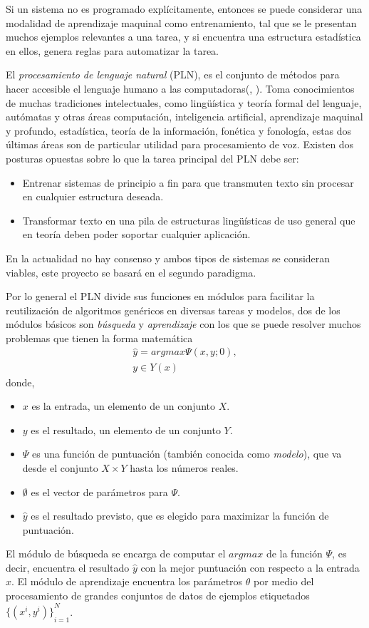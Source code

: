 Si un sistema no es programado explícitamente, entonces se puede considerar una modalidad de aprendizaje maquinal como entrenamiento, tal que se le presentan muchos ejemplos relevantes a una tarea, y si encuentra una estructura estadística en ellos, genera reglas para automatizar la tarea.

El \emph{procesamiento de lenguaje natural} (PLN), es el conjunto de métodos para hacer accesible el lenguaje humano a las computadoras(\citeauthor{eise19}, \citeyear{eise19}). Toma conocimientos de muchas tradiciones intelectuales, como lingüística y teoría formal del lenguaje, autómatas y otras áreas computación, inteligencia artificial, aprendizaje maquinal y profundo, estadística, teoría de la información, fonética y fonología, estas dos últimas áreas son de particular utilidad para procesamiento de voz. Existen dos posturas opuestas sobre lo que la tarea principal del PLN debe ser:
\begin{itemize}
	\item Entrenar sistemas de principio a fin para que transmuten texto sin procesar en cualquier estructura deseada.
	\item Transformar texto en una pila de estructuras lingüísticas de uso general que en teoría deben poder soportar cualquier aplicación.
\end{itemize}
En la actualidad no hay consenso y ambos tipos de sistemas se consideran viables, este proyecto se basará en el segundo paradigma. 

Por lo general el PLN divide sus funciones en módulos para facilitar la reutilización de algoritmos genéricos en diversas tareas y modelos, dos de los módulos básicos son \emph{búsqueda} y \emph{aprendizaje} con los que se puede resolver muchos problemas que tienen la forma matemática
\begin{equation}
\begin{matrix}
\hat{y}=argmax\Psi(x,y;0),\\
y\in Y(x)
\end{matrix}\label{EQ:NLP1}
\end{equation}
donde,
\begin{itemize}
	\item $x$ es la entrada, un elemento de un conjunto $X$.
	\item $y$ es el resultado, un elemento de un conjunto $Y$.
	\item $\Psi$ es una función de puntuación (también conocida como \emph{modelo}), que va desde el conjunto $X\times Y$ hasta los números reales.
	\item $\emptyset$ es el vector de parámetros para $\Psi$.
	\item $\hat{y}$ es el resultado previsto, que es elegido para maximizar la función de puntuación.
\end{itemize}
El módulo de búsqueda se encarga de computar el $argmax$ de la función $\Psi$, es decir, encuentra el resultado $\hat{y}$ con la mejor puntuación con respecto a la entrada $x$. El módulo de aprendizaje encuentra los parámetros $\theta$ por medio del procesamiento de grandes conjuntos de datos de ejemplos etiquetados ${\{(x^i,y^i)\}}_{i=1}^{N}$.

